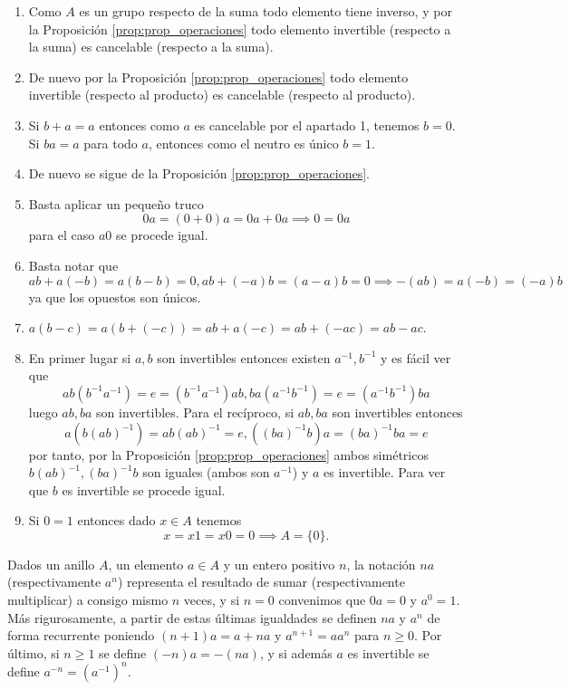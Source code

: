 \begin{proofbox}
    \begin{enumerate}
        \item Como $A$ es un grupo respecto de la suma todo elemento tiene inverso, y por la Proposición \ref{prop:prop_operaciones} todo elemento invertible (respecto a la suma) es cancelable (respecto a la suma).
        \item De nuevo por la Proposición \ref{prop:prop_operaciones} todo elemento invertible (respecto al producto) es cancelable (respecto al producto).
        \item Si $b + a = a$ entonces como $a$ es cancelable por el apartado 1, tenemos $b=0$. Si $ba=a$ para todo $a$, entonces como el neutro es único $b=1$.
        \item De nuevo se sigue de la Proposición \ref{prop:prop_operaciones}.
        \item Basta aplicar un pequeño truco
        \[
        0a=(0+0)a = 0a + 0a \implies 0 = 0a
        \]
        para el caso $a0$ se procede igual.
        \item Basta notar que
        \[
        ab + a(-b) = a(b-b) = 0, ab + (-a)b = (a-a)b = 0 \implies -(ab)=a(-b) = (-a)b 
        \]
        ya que los opuestos son únicos.
        \item $a(b-c)=a(b+(-c))=ab+a(-c)=ab+(-ac)=ab-ac$.
        \item En primer lugar si $a,b$ son invertibles entonces existen $a^{-1},b^{-1}$ y es fácil ver que
        \[
        ab(b^{-1}a^{-1})=e=(b^{-1}a^{-1})ab, ba(a^{-1}b^{-1})=e=(a^{-1}b^{-1})ba
        \]
        luego $ab,ba$ son invertibles. Para el recíproco, si $ab,ba$ son invertibles entonces
        \[
        a(b(ab)^{-1})=ab(ab)^{-1}=e, ((ba)^{-1}b)a=(ba)^{-1}ba=e
        \]
        por tanto, por la Proposición \ref{prop:prop_operaciones} ambos simétricos $b(ab)^{-1},(ba)^{-1}b$ son iguales (ambos son $a^{-1}$) y $a$ es invertible. Para ver que $b$ es invertible se procede igual.
        \item Si $0=1$ entonces dado $x \in A$ tenemos
        \[
        x = x1 = x0 = 0 \implies A=\{0\}.
        \]
    \end{enumerate}
\end{proofbox}

Dados un anillo $A$, un elemento $a \in A$ y un entero positivo $n$, la notación $na$ (respectivamente $a^n$) representa el resultado de sumar (respectivamente multiplicar) a consigo mismo $n$ veces, y si $n = 0$ convenimos que $0a = 0$ y $a^0 = 1$. Más rigurosamente, a partir de estas últimas igualdades se definen $na$ y $a^n$ de forma recurrente poniendo $(n + 1)a = a + na$ y $a^{n+1} = aa^n$ para $n \geq 0$. Por último, si $n \geq 1$ se define $(-n)a = -(na)$, y si además $a$ es invertible se define $a^{-n} = (a^{-1})^n$.

